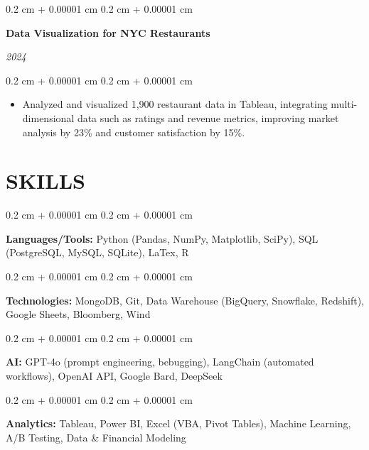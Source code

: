 \documentclass[10pt, letterpaper]{article}
\newenvironment{highlights}{
    \begin{itemize}[
        topsep=0.05 cm,
        parsep=0.05 cm,
        partopsep=0pt,
        itemsep=0pt,
        leftmargin=0.4 cm + 10pt
    ]
}{
    \end{itemize}
} %
\newenvironment{onecolentry}{
    \begin{adjustwidth}{
        0.2 cm + 0.00001 cm
    }{
        0.2 cm + 0.00001 cm
    }
}{
    \end{adjustwidth}
} %
\newenvironment{twocolentry}[2][]{
    \onecolentry
    \def\secondColumn{#2}
    \setcolumnwidth{\fill, 4.5 cm}
    \begin{paracol}{2}
}{
    \switchcolumn \raggedleft \secondColumn
    \end{paracol}
    \endonecolentry
} %
\begin{document}
        \vspace{0.2 cm}
        \begin{twocolentry}{
        
        \textit{2024}}
            \textbf{Data Visualization for NYC Restaurants}
        \end{twocolentry}

        \vspace{0.10 cm}
        \begin{onecolentry}
            \begin{highlights}
                \item Analyzed and visualized 1,900 restaurant data in Tableau, integrating multi-dimensional data such as ratings and revenue metrics, improving market analysis by 23\% and customer satisfaction by 15\%.
            \end{highlights}
        \end{onecolentry}

        \section{SKILLS}



        
        \begin{onecolentry}
            \textbf{Languages/Tools:} Python (Pandas, NumPy, Matplotlib, SciPy), SQL (PostgreSQL, MySQL, SQLite), LaTex, R \end{onecolentry}

        \vspace{0.1 cm}

        \begin{onecolentry}
            \textbf{Technologies:} MongoDB, Git, Data Warehouse (BigQuery, Snowflake, Redshift), Google Sheets, Bloomberg, Wind \end{onecolentry}

        \vspace{0.1 cm}

        \begin{onecolentry}
            \textbf{AI:} GPT-4o (prompt engineering, bebugging), LangChain (automated workflows), OpenAI API, Google Bard, DeepSeek 
            \end{onecolentry}
            
        \vspace{0.1 cm}
        
        \begin{onecolentry}
            \textbf{Analytics:} Tableau, Power BI, Excel (VBA, Pivot Tables), Machine Learning, A/B Testing, Data \& Financial Modeling 
            \end{onecolentry}
\end{document}

